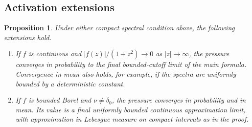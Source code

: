 \documentclass[11pt]{article}
\numberwithin{equation}{section}
\newtheorem{proposition}[theorem]{Proposition}
\theoremstyle{definition}
\begin{document}
\subsection{Activation extensions}
\begin{proposition}\label{prop:activations}
Under either compact spectral condition above, the following extensions hold.
\begin{enumerate}[label=(\roman*),leftmargin=*]
\item If $f$ is continuous and $|f(z)|/(1+z^2)\to0$ as $|z|\to\infty$, the pressure converges in probability to the final bounded-cutoff limit of the main formula. Convergence in mean also holds, for example, if the spectra are uniformly bounded by a deterministic constant.
\item If $f$ is bounded Borel and $\nu\ne\delta_0$, the pressure converges in probability and in mean. Its value is a final uniformly bounded continuous approximation limit, with approximation in Lebesgue measure on compact intervals as in the proof.
\end{enumerate}
\end{proposition}
\end{document}
